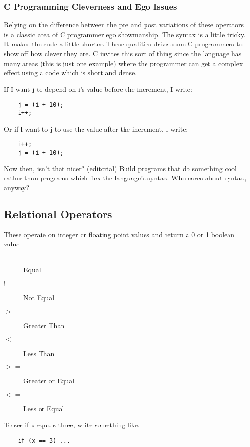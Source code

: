 \subsubsection{C Programming Cleverness and Ego Issues}

Relying on the difference between the pre and post variations of these operators is a classic area of C programmer ego showmanship. The syntax is a little tricky. It makes the code a little shorter. These qualities drive some C programmers to show off how clever they are. C invites this sort of thing since the language has many areas (this is just one example) where the programmer can get a complex effect using a code which is short and dense.

If I want j to depend on i's value before the increment, I write:

\begin{lstlisting}
    j = (i + 10);
    i++;
\end{lstlisting}

Or if I want to j to use the value after the increment, I write:

\begin{lstlisting}
    i++;
    j = (i + 10);
\end{lstlisting}

Now then, isn't that nicer? (editorial) Build programs that do something cool rather than programs which flex the language's syntax.   Who cares about syntax, anyway?

\subsection{Relational Operators}

These operate on integer or floating point values and return a 0 or 1 boolean value. 

\begin{description}
\item[$==$] Equal
\item[$!=$] Not Equal
\item[$>$] Greater Than
\item[$<$] Less Than
\item[$>=$] Greater or Equal
\item[$<=$] Less or Equal
\end{description}

To see if x equals three, write something like:

\begin{lstlisting}
    if (x == 3) ...
\end{lstlisting}


